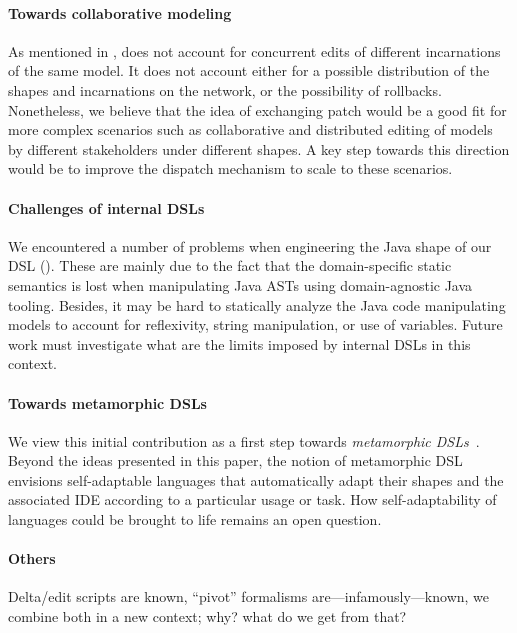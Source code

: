 \paragraph{Towards collaborative modeling}
As mentioned in , \prism does not account for concurrent edits of different incarnations of the same model.
It does not account either for a possible distribution of the shapes and incarnations on the network, or the possibility of rollbacks.
Nonetheless, we believe that the idea of exchanging patch would be a good fit for more complex scenarios such as collaborative and distributed editing of models by different stakeholders under different shapes.
A key step towards this direction would be to improve the dispatch mechanism to scale to these scenarios.

\paragraph{Challenges of internal DSLs}
We encountered a number of problems when engineering the Java shape of our DSL ().
These are mainly due to the fact that the domain-specific static semantics is lost when manipulating Java ASTs using domain-agnostic Java tooling.
Besides, it may be hard to statically analyze the Java code manipulating models to account for reflexivity, string manipulation, or use of variables.
Future work must investigate what are the limits imposed by internal DSLs in this context.


\paragraph{Towards metamorphic DSLs}
We view this initial contribution as a first step towards \emph{metamorphic DSLs}~\cite{acher2014metamorphic}.
Beyond the ideas presented in this paper, the notion of metamorphic DSL envisions self-adaptable languages that automatically adapt their shapes and the associated IDE according to a particular usage or task.
How self-adaptability of languages could be brought to life remains an open question.

\paragraph{Others}
Delta/edit scripts are known, ``pivot'' formalisms are---infamously---known, we combine both in a new context; why? what do we get from that?
